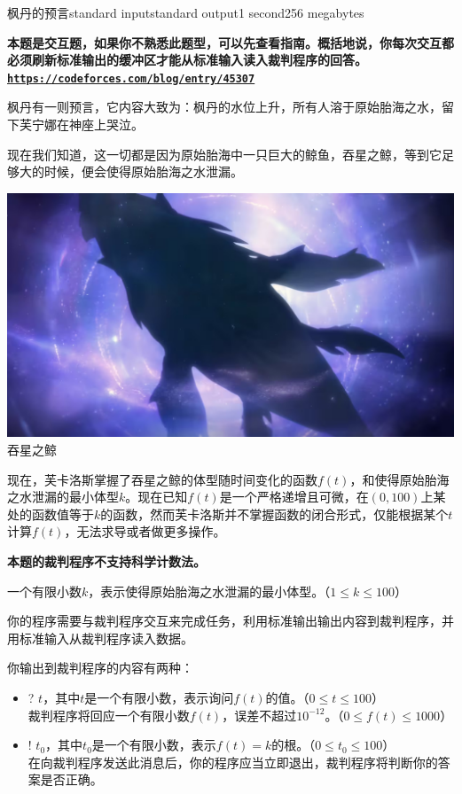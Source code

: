 \begin{problem}{枫丹的预言}{standard input}{standard output}{1 second}{256 megabytes}

\providecommand{\url}[1]{\underline{\texttt{#1}}}

\textbf {本题是交互题，如果你不熟悉此题型，可以先查看指南。概括地说，你每次交互都必须刷新标准输出的缓冲区才能从标准输入读入裁判程序的回答。\url{https://codeforces.com/blog/entry/45307}}

枫丹有一则预言，它内容大致为：枫丹的水位上升，所有人溶于原始胎海之水，留下芙宁娜在神座上哭泣。

现在我们知道，这一切都是因为原始胎海中一只巨大的鲸鱼，吞星之鲸，等到它足够大的时候，便会使得原始胎海之水泄漏。


\begin{center}
  \includegraphics[scale=0.4]{whale.jpg} \\
  \small{吞星之鲸}
\end{center}

现在，芙卡洛斯掌握了吞星之鲸的体型随时间变化的函数$f(t)$，和使得原始胎海之水泄漏的最小体型$k$。现在已知$f(t)$是一个严格递增且可微，在$(0, 100)$上某处的函数值等于$k$的函数，然而芙卡洛斯并不掌握函数的闭合形式，仅能根据某个$t$计算$f(t)$，无法求导或者做更多操作。

\InputFile
\textbf {本题的裁判程序不支持科学计数法。}

一个有限小数$k$，表示使得原始胎海之水泄漏的最小体型。（$1 \le k \le 100$）

\Interaction
你的程序需要与裁判程序交互来完成任务，利用标准输出输出内容到裁判程序，并用标准输入从裁判程序读入数据。

你输出到裁判程序的内容有两种：

\begin{itemize}
\item ? $t$，其中$t$是一个有限小数，表示询问$f(t)$的值。（$0 \le t \le 100$）\\
裁判程序将回应一个有限小数$f(t)$，误差不超过$10^{-12}$。（$0 \le f(t) \le 1000$）
\item ! $t_0$，其中$t_0$是一个有限小数，表示$f(t) = k$的根。（$0 \le t_0 \le 100$）\\
在向裁判程序发送此消息后，你的程序应当立即退出，裁判程序将判断你的答案是否正确。
\end{itemize}


\end{problem}
